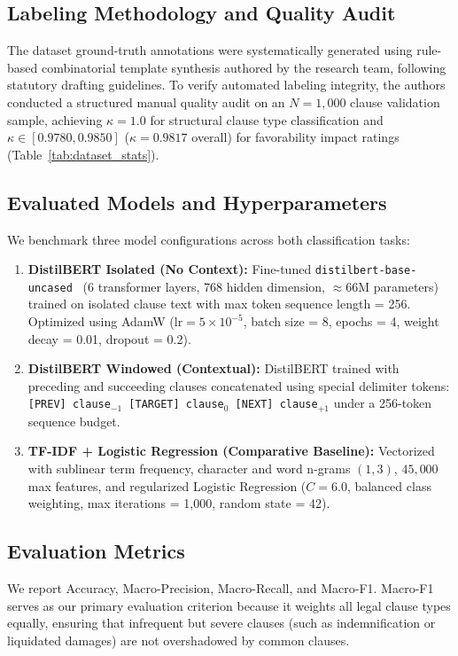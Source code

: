 \documentclass[conference]{IEEEtran}
\begin{document}
\subsection{Labeling Methodology and Quality Audit}
The dataset ground-truth annotations were systematically generated using rule-based combinatorial template synthesis authored by the research team, following statutory drafting guidelines. To verify automated labeling integrity, the authors conducted a structured manual quality audit on an $N=1,000$ clause validation sample, achieving $\kappa = 1.0$ for structural clause type classification and $\kappa \in [0.9780, 0.9850]$ ($\kappa = 0.9817$ overall) for favorability impact ratings (Table~\ref{tab:dataset_stats}).

\subsection{Evaluated Models and Hyperparameters}
We benchmark three model configurations across both classification tasks:
\begin{enumerate}
    \item \textbf{DistilBERT Isolated (No Context):} Fine-tuned \texttt{distilbert-base-uncased}~\cite{sanh2019distilbert, devlin2019bert} (6 transformer layers, 768 hidden dimension, $\approx 66\text{M}$ parameters) trained on isolated clause text with max token sequence length = 256. Optimized using AdamW ($\text{lr} = 5 \times 10^{-5}$, batch size = 8, epochs = 4, weight decay = 0.01, dropout = 0.2).
    \item \textbf{DistilBERT Windowed (Contextual):} DistilBERT trained with preceding and succeeding clauses concatenated using special delimiter tokens: \texttt{[PREV] clause$_{-1}$ [TARGET] clause$_0$ [NEXT] clause$_{+1}$} under a 256-token sequence budget.
    \item \textbf{TF-IDF + Logistic Regression (Comparative Baseline):} Vectorized with sublinear term frequency, character and word n-grams $(1, 3)$, $45,000$ max features, and regularized Logistic Regression ($C = 6.0$, balanced class weighting, max iterations = 1,000, random state = 42).
\end{enumerate}

\subsection{Evaluation Metrics}
We report Accuracy, Macro-Precision, Macro-Recall, and Macro-F1. Macro-F1 serves as our primary evaluation criterion because it weights all legal clause types equally, ensuring that infrequent but severe clauses (such as indemnification or liquidated damages) are not overshadowed by common clauses.
\end{document}
